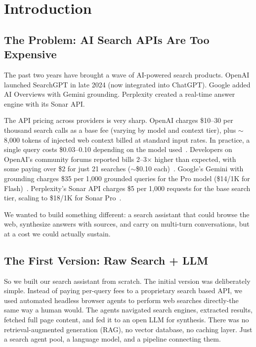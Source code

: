 \documentclass[conference]{IEEEtran}
\begin{document}
\section{Introduction}

\subsection{The Problem: AI Search APIs Are Too Expensive}

The past two years have brought a wave of AI-powered search products. OpenAI launched SearchGPT in late 2024 (now integrated into ChatGPT). Google added AI Overviews with Gemini grounding. Perplexity created a real-time answer engine with its Sonar API.

The API pricing across providers is very sharp. OpenAI charges \$10--30 per thousand search calls as a base fee (varying by model and context tier), plus ${\sim}$8{,}000 tokens of injected web context billed at standard input rates. In practice, a single query costs \$0.03--0.10 depending on the model used~\cite{openai_search_pricing}. Developers on OpenAI's community forums reported bills 2--3$\times$ higher than expected, with some paying over \$2 for just 21 searches (${\sim}$\$0.10 each)~\cite{openai_search_billing}. Google's Gemini with grounding charges \$35 per 1{,}000 grounded queries for the Pro model (\$14/1K for Flash)~\cite{google_grounding_pricing}. Perplexity's Sonar API charges \$5 per 1{,}000 requests for the base search tier, scaling to \$18/1K for Sonar Pro~\cite{perplexity_pricing}.

We wanted to build something different: a search assistant that could browse the web, synthesize answers with sources, and carry on multi-turn conversations, but at a cost we could actually sustain.

\subsection{The First Version: Raw Search + LLM}

So we built our search assistant from scratch. The initial version was deliberately simple. Instead of paying per-query fees to a proprietary search based API, we used automated headless browser agents to perform web searches directly-the same way a human would. The agents navigated search engines, extracted results, fetched full page content, and fed it to an open LLM for synthesis. There was no retrieval-augmented generation (RAG), no vector database, no caching layer. Just a search agent pool, a language model, and a pipeline connecting them.
\end{document}
